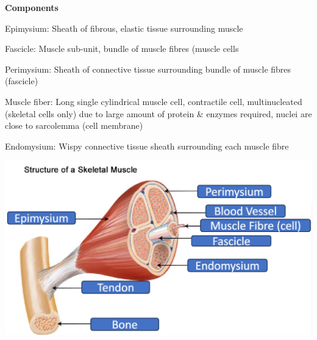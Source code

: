 \documentclass[11pt,fleqn]{book} %
\begin{document}
\textbf{Components}
\begin{descriptions}
    \item[Epimysium: ]Sheath of fibrous, elastic
tissue surrounding muscle
    \item[Fascicle: ]Muscle sub-unit, bundle of muscle fibres
(muscle cells 
    \item[Perimysium: ]Sheath of connective
tissue surrounding bundle
of muscle fibres (fascicle)
    \item[Muscle fiber: ]Long single cylindrical muscle cell, contractile cell, multinucleated (skeletal
cells only) due to large
amount of protein \&
enzymes required, nuclei are close to
sarcolemma (cell
membrane)
    \item[Endomysium: ]Wispy connective tissue
sheath surrounding
each muscle fibre
\end{descriptions}
\begin{center}
    \includegraphics[width=0.65\linewidth]{Pictures/Screenshot 2024-04-03 002531.png}
\end{center}
\end{document}
